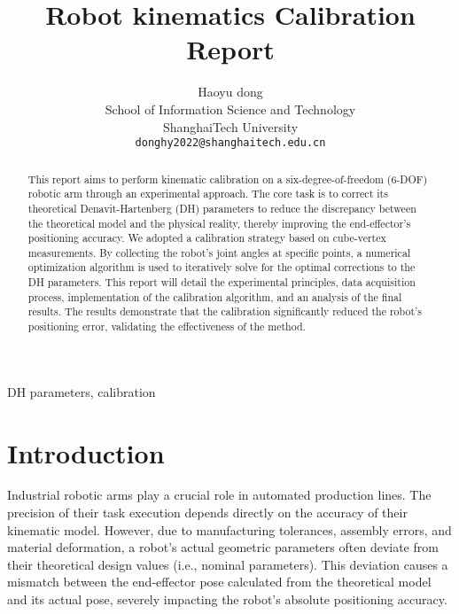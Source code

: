 \documentclass[conference]{IEEEtran}
\begin{document}
\title{Robot kinematics Calibration Report\\

}

\author{Haoyu dong\\
	School of Information Science and Technology\\
	ShanghaiTech University\\
	\texttt{donghy2022@shanghaitech.edu.cn} \\
}

\maketitle

\begin{abstract}
This report aims to perform kinematic calibration on a six-degree-of-freedom (6-DOF) robotic arm through an experimental approach. The core task is to correct its theoretical Denavit-Hartenberg (DH) parameters to reduce the discrepancy between the theoretical model and the physical reality, thereby improving the end-effector's positioning accuracy. We adopted a calibration strategy based on cube-vertex measurements. By collecting the robot's joint angles at specific points, a numerical optimization algorithm is used to iteratively solve for the optimal corrections to the DH parameters. This report will detail the experimental principles, data acquisition process, implementation of the calibration algorithm, and an analysis of the final results. The results demonstrate that the calibration significantly reduced the robot's positioning error, validating the effectiveness of the method.
\end{abstract}

\begin{IEEEkeywords}
 DH parameters, calibration
\end{IEEEkeywords}

\section{Introduction}
Industrial robotic arms play a crucial role in automated production lines. The precision of their task execution depends directly on the accuracy of their kinematic model. However, due to manufacturing tolerances, assembly errors, and material deformation, a robot's actual geometric parameters often deviate from their theoretical design values (i.e., nominal parameters). This deviation causes a mismatch between the end-effector pose calculated from the theoretical model and its actual pose, severely impacting the robot's absolute positioning accuracy.
\end{document}
